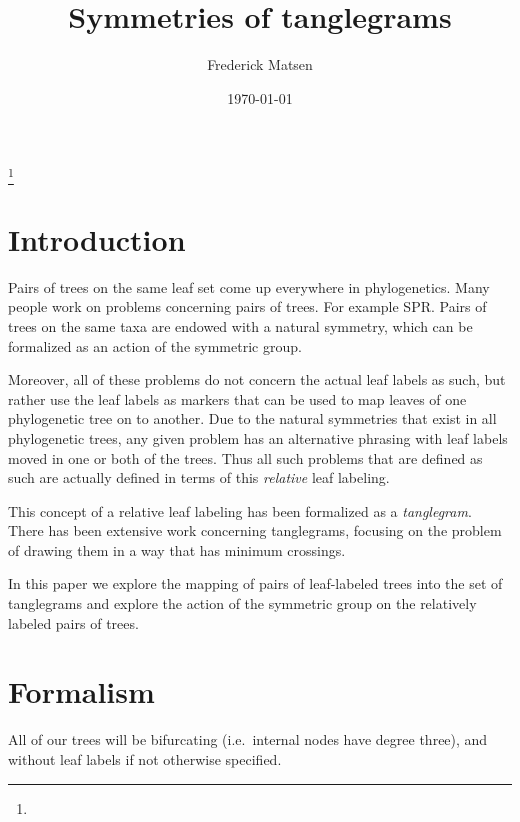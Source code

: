 \documentclass{amsart}
\begin{document}
\title{Symmetries of tanglegrams}
\author[Matsen]{Frederick Matsen}
\address{}
\thanks{}

\date{\today}


\maketitle



\section{Introduction}
Pairs of trees on the same leaf set come up everywhere in phylogenetics.
Many people work on problems concerning pairs of trees.
For example SPR.
Pairs of trees on the same taxa are endowed with a natural symmetry, which can be formalized as an action of the symmetric group.

Moreover, all of these problems do not concern the actual leaf labels as such, but rather use the leaf labels as markers that can be used to map leaves of one phylogenetic tree on to another.
Due to the natural symmetries that exist in all phylogenetic trees, any given problem has an alternative phrasing with leaf labels moved in one or both of the trees.
Thus all such problems that are defined as such are actually defined in terms of this \textit{relative} leaf labeling.

This concept of a relative leaf labeling has been formalized as a \textit{tanglegram}.
There has been extensive work concerning tanglegrams, focusing on the problem of drawing them in a way that has minimum crossings.

In this paper we explore the mapping of pairs of leaf-labeled trees into the set of tanglegrams and explore the action of the symmetric group on the relatively labeled pairs of trees.


\section{Formalism}

All of our trees will be bifurcating (i.e.\ internal nodes have degree three), and without leaf labels if not otherwise specified.
\end{document}
